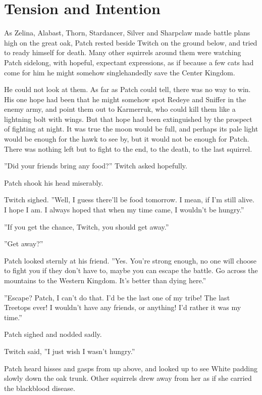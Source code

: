 \documentclass[12pt]{book}
\begin{document}
\section{Tension and Intention}

 As Zelina, Alabast, Thorn, Stardancer, Silver and Sharpclaw made battle plans high on the great oak, Patch rested beside Twitch on the ground below, and tried to ready himself for death. Many other squirrels around them were watching Patch sidelong, with hopeful, expectant expressions, as if because a few cats had come for him he might somehow singlehandedly save the Center Kingdom.\par
He could not look at them. As far as Patch could tell, there was no way to win. His one hope had been that he might somehow spot Redeye and Sniffer in the enemy army, and point them out to Karmerruk, who could kill them like a lightning bolt with wings. But that hope had been extinguished by the prospect of fighting at night. It was true the moon would be full, and perhaps its pale light would be enough for the hawk to see by, but it would not be enough for Patch. There was nothing left but to fight to the end, to the death, to the last squirrel. \par
 ''Did your friends bring any food?'' Twitch asked hopefully.\par
 Patch shook his head miserably.\par
 Twitch sighed. ''Well, I guess there'll be food tomorrow. I mean, if I'm still alive. I hope I am. I always hoped that when my time came, I wouldn't be hungry.''\par
 ''If you get the chance, Twitch, you should get away.''\par
 ''Get away?''\par
 Patch looked sternly at his friend. ''Yes. You're strong enough, no one will choose to fight you if they don't have to, maybe you can escape the battle. Go across the mountains to the Western Kingdom. It's better than dying here.''\par
 ''Escape? Patch, I can't do that. I'd be the last one of my tribe! The last Treetops ever! I wouldn't have any friends, or anything! I'd rather it was my time.''\par
 Patch sighed and nodded sadly.\par
 Twitch said, ''I just wish I wasn't hungry.''\par
 Patch heard hisses and gasps from up above, and looked up to see White padding slowly down the oak trunk. Other squirrels drew away from her as if she carried the blackblood disease.\par
\end{document}
